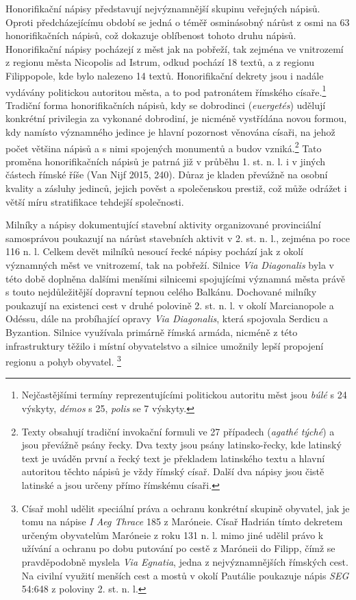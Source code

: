 Honorifikační nápisy představují nejvýznamnější skupinu veřejných nápisů. Oproti předcházejícímu období se jedná o téměř osminásobný nárůst z osmi na 63 honorifikačních nápisů, což dokazuje oblíbenost tohoto druhu nápisů. Honorifikační nápisy pocházejí z měst jak na pobřeží, tak zejména ve vnitrozemí z regionu města Nicopolis ad Istrum, odkud pochází 18 textů, a z regionu Filippopole, kde bylo nalezeno 14 textů. Honorifikační dekrety jsou i nadále vydávány politickou autoritou města, a to pod patronátem římského císaře.\footnote{Nejčastějšími termíny reprezentujícími politickou autoritu měst jsou {\em búlé} s 24 výskyty, {\em démos} s 25, {\em polis} se 7 výskyty.} Tradiční forma honorifikačních nápisů, kdy se dobrodinci ({\em euergetés}) udělují konkrétní privilegia za vykonané dobrodiní, je nicméně vystřídána novou formou, kdy namísto významného jedince je hlavní pozornost věnována císaři, na jehož počet většina nápisů a s nimi spojených monumentů a budov vzniká.\footnote{Texty obsahují tradiční invokační formuli ve 27 případech ({\em agathé týché}) a jsou převážně psány řecky. Dva texty jsou psány latinsko-řecky, kde latinský text je uváděn první a řecký text je překladem latinského textu a hlavní autoritou těchto nápisů je vždy římský císař. Další dva nápisy jsou čistě latinské a jsou určeny přímo římskému císaři.} Tato proměna honorifikačních nápisů je patrná již v průběhu 1. st. n. l. i v jiných částech římské říše (Van Nijf 2015, 240). Důraz je kladen převážně na osobní kvality a zásluhy jedinců, jejich pověst a společenskou prestiž, což může odrážet i větší míru stratifikace tehdejší společnosti.

Milníky a nápisy dokumentující stavební aktivity organizované provinciální samosprávou poukazují na nárůst stavebních aktivit v 2. st. n. l., zejména po roce 116 n. l. Celkem devět milníků nesoucí řecké nápisy pochází jak z okolí významných měst ve vnitrozemí, tak na pobřeží. Silnice {\em Via Diagonalis} byla v této době doplněna dalšími menšími silnicemi spojujícími významná města právě s touto nejdůležitější dopravní tepnou celého Balkánu. Dochované milníky poukazují na existenci cest v druhé polovině 2. st. n. l. v okolí Marcianopole a Odéssu, dále na probíhající opravy {\em Via Diagonalis}, která spojovala Serdicu a Byzantion. Silnice využívala primárně římská armáda, nicméně z této infrastruktury těžilo i místní obyvatelstvo a silnice umožnily lepší propojení regionu a pohyb obyvatel. \footnote{Císař mohl udělit speciální práva a ochranu konkrétní skupině obyvatel, jak je tomu na nápise {\em I Aeg Thrace} 185 z Maróneie. Císař Hadrián tímto dekretem určeným obyvatelům Maróneie z roku 131 n. l. mimo jiné udělil právo k užívání a ochranu po dobu putování po cestě z Maróneii do Filipp, čímž se pravděpodobně myslela {\em Via Egnatia}, jedna z nejvýznamnějších římských cest. Na civilní využití menších cest a mostů v okolí Pautálie poukazuje nápis {\em SEG} 54:648 z poloviny 2. st. n. l.}

